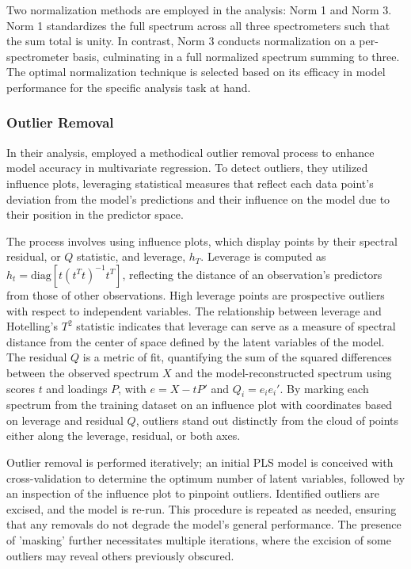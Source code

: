 Two normalization methods are employed in the analysis: Norm 1 and Norm 3.
Norm 1 standardizes the full spectrum across all three spectrometers such that the sum total is unity.
In contrast, Norm 3 conducts normalization on a per-spectrometer basis, culminating in a full normalized spectrum summing to three.
The optimal normalization technique is selected based on its efficacy in model performance for the specific analysis task at hand.

\subsubsection{Outlier Removal}\label{sec:outlier_removal}

In their analysis, \citet{andersonImprovedAccuracyQuantitative2017} employed a methodical outlier removal process to enhance model accuracy in multivariate regression. To detect outliers, they utilized influence plots, leveraging statistical measures that reflect each data point's deviation from the model's predictions and their influence on the model due to their position in the predictor space.

The process involves using influence plots, which display points by their spectral residual, or $Q$ statistic, and leverage, $h_{T}$. Leverage is computed as $h_{t} = \text{diag}\left[ t(t^{T}t)^{-1}t^{T} \right]$, reflecting the distance of an observation's predictors from those of other observations. High leverage points are prospective outliers with respect to independent variables. The relationship between leverage and Hotelling's $T^{2}$ statistic indicates that leverage can serve as a measure of spectral distance from the center of space defined by the latent variables of the model.
The residual $Q$ is a metric of fit, quantifying the sum of the squared differences between the observed spectrum $X$ and the model-reconstructed spectrum using scores $t$ and loadings $P$, with $e = X - tP'$ and $Q_{i} = e_{i}e_{i}'$. By marking each spectrum from the training dataset on an influence plot with coordinates based on leverage and residual $Q$, outliers stand out distinctly from the cloud of points either along the leverage, residual, or both axes.

Outlier removal is performed iteratively; an initial PLS model is conceived with cross-validation to determine the optimum number of latent variables, followed by an inspection of the influence plot to pinpoint outliers. Identified outliers are excised, and the model is re-run. This procedure is repeated as needed, ensuring that any removals do not degrade the model's general performance. The presence of 'masking' further necessitates multiple iterations, where the excision of some outliers may reveal others previously obscured.


